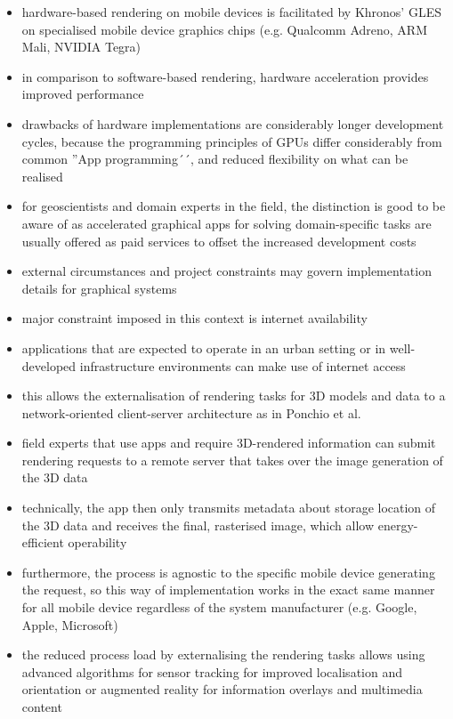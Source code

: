 \documentclass[review]{elsarticle}
\begin{document}
\begin{itemize}
\item hardware-based rendering on mobile devices is facilitated by Khronos' \gls{GLES} \cite{Mehta2013} on specialised mobile device graphics chips (e.g. Qualcomm Adreno, ARM Mali, NVIDIA Tegra)
\item in comparison to software-based rendering, hardware acceleration provides improved performance
\item drawbacks of hardware implementations are considerably longer development cycles, because the programming principles of GPUs differ considerably from common ''App programming´´, and reduced flexibility on what can be realised
\item for geoscientists and domain experts in the field, the distinction is good to be aware of as accelerated graphical apps for solving domain-specific tasks are usually offered as paid services to offset the increased development costs
\item external circumstances and project constraints may govern implementation details for graphical systems
\item major constraint imposed in this context is internet availability
\item applications that are expected to operate in an urban setting or in well-developed infrastructure environments can make use of internet access
\item this allows the externalisation of rendering tasks for 3D models and data to a network-oriented client-server architecture as in Ponchio et al. \cite{Ponchio2016}
\item field experts that use apps and require 3D-rendered information can submit rendering requests to a remote server that takes over the image generation of the 3D data
\item technically, the app then only transmits metadata about storage location of the 3D data and receives the final, rasterised image, which allow energy-efficient operability 
\item furthermore, the process is agnostic to the specific mobile device generating the request, so this way of implementation works in the exact same manner for all mobile device regardless of the system manufacturer (e.g. Google, Apple, Microsoft)
\item the reduced process load by externalising the rendering tasks allows using advanced algorithms for sensor tracking \cite{} for improved localisation and orientation or augmented reality \cite{} for information overlays and multimedia content

\end{itemize}
\end{document}
